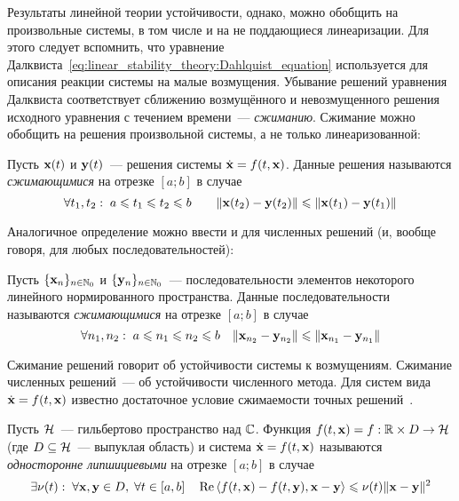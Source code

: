 Результаты линейной теории устойчивости, однако, можно обобщить на произвольные системы,
в том числе и на не поддающиеся линеаризации.
Для этого следует вспомнить, что уравнение Далквиста~\eqref{eq:linear_stability_theory:Dahlquist_equation}
используется для описания реакции системы на малые возмущения.
Убывание решений уравнения Далквиста соответствует сближению
возмущённого и невозмущенного решения исходного уравнения с течением времени~--- \emph{сжиманию}.
Сжимание можно обобщить на решения произвольной системы,
а не только линеаризованной:

\begin{definition}
    \label{definition:nonlinear_stability_theory:contractivity}
    Пусть $ \mathbf{x}(t) $ и $ \mathbf{y}(t) $~--- решения системы $ \dot{\mathbf{x}} = f(t, \mathbf{x}) $.
    Данные решения называются \emph{сжимающимися} на отрезке $ [a; b] $ в случае
    \[
        \forall t_1, t_2: \; a \leqslant t_1 \leqslant t_2 \leqslant b \qquad \| \mathbf{x}(t_2) - \mathbf{y}(t_2) \|
        \leqslant \| \mathbf{x}(t_1) - \mathbf{y}(t_1) \|
    \]
\end{definition}

Аналогичное определение можно ввести и для численных решений (и, вообще говоря, для любых последовательностей):

\begin{definition}
    \label{definition:nonlinear_stability_theory:contractivity_sequence}
    Пусть $ \{\mathbf{x}_n\}_{n \in \mathbb{N}_0} $ и $ \{\mathbf{y}_n\}_{n \in \mathbb{N}_0} $~---
    последовательности элементов некоторого линейного нормированного пространства.
    Данные последовательности называются \emph{сжимающимися} на отрезке $ [a; b] $ в случае
    \[
        \forall n_1, n_2: \; a \leqslant n_1 \leqslant n_2 \leqslant b \quad \| \mathbf{x}_{n_2} - \mathbf{y}_{n_2} \| \leqslant \| \mathbf{x}_{n_1} - \mathbf{y}_{n_1} \|
    \]
\end{definition}

Сжимание решений говорит об устойчивости системы к возмущениям.
Сжимание численных решений~--- об устойчивости численного метода.
Для систем вида $ \dot{\mathbf{x}} = f(t, \mathbf{x}) $ известно достаточное условие
сжимаемости точных решений~\cite{auzinger1990note, auzinger1993modern}.

\begin{definition}
    \label{definition:nonlinear_stability_theory:one-sided_lipschitz}
    Пусть $ \mathcal{H} $~--- гильбертово пространство над $ \mathbb{C} $.
    Функция $ f(t, \mathbf{x}) = f: \mathbb{R} \times D \to \mathcal{H} $
    (где $ D \subseteq \mathcal{H} $~--- выпуклая область)
    и система $ \dot{\mathbf{x}} = f(t, \mathbf{x}) $ называются \emph{односторонне липшициевыми} на отрезке $ [a; b] $ в случае
    \[
        \exists \nu(t): \; \forall \mathbf{x}, \mathbf{y} \in D, \; \forall t \in [a, b] \quad
        \operatorname{Re} \left\langle f(t, \mathbf{x}) - f(t, \mathbf{y}), \mathbf{x} - \mathbf{y} \right\rangle \leqslant \nu(t) \| \mathbf{x} - \mathbf{y} \|^2
    \]
\end{definition}

